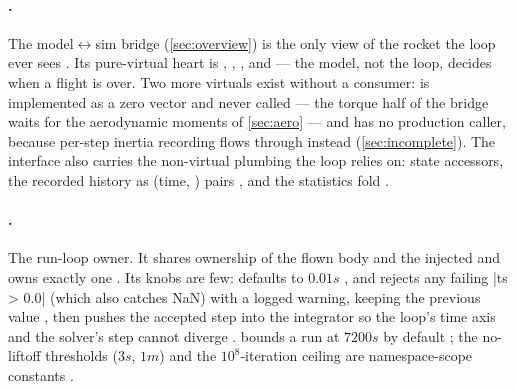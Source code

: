 \paragraph{.} The model$\leftrightarrow$sim bridge
(\cref{sec:overview}) is the only view of the rocket the loop ever sees
. Its pure-virtual heart is  ,  ,
 , and
  --- the model, not the loop, decides
when a flight is over. Two more virtuals exist without a consumer:  is
implemented as a zero vector and never called  --- the torque
half of the bridge waits for the aerodynamic moments of \cref{sec:aero} --- and
  has no production caller,
because per-step inertia recording flows through  instead
(\cref{sec:incomplete}). The interface also carries the non-virtual plumbing the loop relies on:
state accessors, the recorded history as (time, ) pairs
, and the statistics fold .

\paragraph{.} The run-loop owner. It shares ownership of the flown body and
the injected   and owns exactly one
 . Its knobs are few:  defaults to
$0.01\unit{s}$ , and  rejects any  failing
\cppinline|ts > 0.0| (which also catches NaN) with a logged warning, keeping the previous value
, then pushes the accepted step into the integrator so the loop's time
axis and the solver's step cannot diverge . 
bounds a run at $7200\unit{s}$ by default ; the no-liftoff thresholds
($3\unit{s}$, $1\unit{m}$) and the $10^{8}$-iteration ceiling are namespace-scope constants
.

